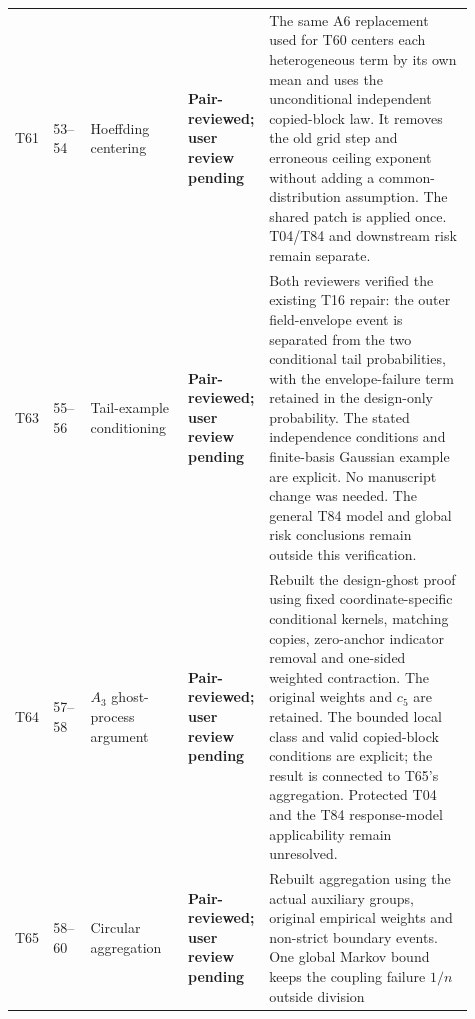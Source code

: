\documentclass[10pt]{article}
\newcommand{\deferred}{\textcolor{deferredred}{\textbf{Deferred}}}
\newcommand{\pairreviewed}{\textcolor{deferredred}{\textbf{Pair-reviewed; user review pending}}}
\begin{document}
\begin{landscape}
\begin{longtable}{L{0.045\linewidth}L{0.08\linewidth}L{0.21\linewidth}L{0.13\linewidth}L{0.445\linewidth}}
T61 & 53--54 & Hoeffding centering & \pairreviewed &
\textcolor{deferredred}{The same A6 replacement used for T60 centers each
heterogeneous term by its own mean and uses the unconditional independent
copied-block law. It removes the old grid step and erroneous ceiling
exponent without adding a common-distribution assumption. The shared
patch is applied once. T04/T84 and downstream risk remain separate.}\\
T63 & 55--56 & Tail-example conditioning & \pairreviewed &
\textcolor{deferredred}{Both reviewers verified the existing T16 repair:
the outer field-envelope event is separated from the two conditional
tail probabilities, with the envelope-failure term retained in the
design-only probability. The stated independence conditions and
finite-basis Gaussian example are explicit. No manuscript change was
needed. The general T84 model and global risk conclusions remain
outside this verification.}\\
T64 & 57--58 & $A_3$ ghost-process argument & \pairreviewed &
\textcolor{deferredred}{Rebuilt the design-ghost proof using fixed
coordinate-specific conditional kernels, matching copies, zero-anchor
indicator removal and one-sided weighted contraction. The original weights
and $c_5$ are retained. The bounded local class and valid copied-block
conditions are explicit; the result is connected to T65's aggregation.
Protected T04 and the T84 response-model applicability remain unresolved.}\\
T65 & 58--60 & Circular aggregation & \pairreviewed &
\textcolor{deferredred}{Rebuilt aggregation using the actual auxiliary
groups, original empirical weights and non-strict boundary events.
One global Markov bound keeps the coupling failure $1/n$ outside division
}
\end{longtable}
\end{landscape}
\end{document}
